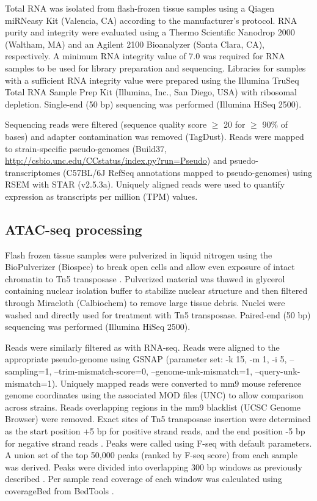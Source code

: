 \documentclass[9pt,twocolumn,twoside]{gsajnl}
\begin{document}
Total RNA was isolated from flash-frozen tissue samples using a Qiagen miRNeasy Kit (Valencia, CA) according to the manufacturer’s protocol. RNA purity and integrity were evaluated using a Thermo Scientific Nanodrop 2000 (Waltham, MA) and an Agilent 2100 Bioanalyzer (Santa Clara, CA), respectively. A minimum RNA integrity value of 7.0 was required for RNA samples to be used for library preparation and sequencing. Libraries for samples with a sufficient RNA integrity value were prepared using the Illumina TruSeq Total RNA Sample Prep Kit (Illumina, Inc., San Diego, USA) with ribosomal depletion. Single-end (50 bp) sequencing was performed (Illumina HiSeq 2500).

Sequencing reads were filtered (sequence quality score $\ge$ 20 for $\ge$ 90\% of bases) and adapter contamination was removed (TagDust). Reads were mapped to strain-specific pseudo-genomes (Build37, \url{http://csbio.unc.edu/CCstatus/index.py?run=Pseudo}) and psuedo-transcriptomes (C57BL/6J RefSeq annotations mapped to pseudo-genomes) using RSEM with STAR (v2.5.3a). Uniquely aligned reads  were used to quantify expression as transcripts per million (TPM) values.

\subsection{ATAC-seq processing}

Flash frozen tissue samples were pulverized in liquid nitrogen using the BioPulverizer (Biospec) to break open cells and allow even exposure of intact chromatin to Tn5 transposase \citep{Buenrostro2015}. Pulverized material was thawed in glycerol containing nuclear isolation buffer to stabilize nuclear structure and then filtered through Miracloth (Calbiochem) to remove large tissue debris. Nuclei were washed and directly used for treatment with Tn5 transposase. Paired-end (50 bp) sequencing was performed (Illumina HiSeq 2500).

Reads were similarly filtered as with RNA-seq. Reads were aligned to the appropriate pseudo-genome using GSNAP (parameter set: -k 15, -m 1, -i 5, –sampling=1, –trim-mismatch-score=0, –genome-unk-mismatch=1, –query-unk-mismatch=1). Uniquely mapped reads were converted to mm9 mouse reference genome coordinates using the associated MOD files (UNC) to allow comparison across strains. Reads overlapping regions in the mm9 blacklist (UCSC Genome Browser) were removed. Exact sites of Tn5 transposase insertion were determined as the start position +5 bp for positive strand reads, and the end position -5 bp for negative strand reads \citep{Buenrostro2013}. Peaks were called using F-seq with default parameters. A union set of the top 50,000 peaks (ranked by F-seq score) from each sample was derived. Peaks were divided into overlapping 300 bp windows as previously described \citep{Shibata2012}. Per sample read coverage of each window was calculated using coverageBed from BedTools \citep{Quinlan2010}.
\end{document}
